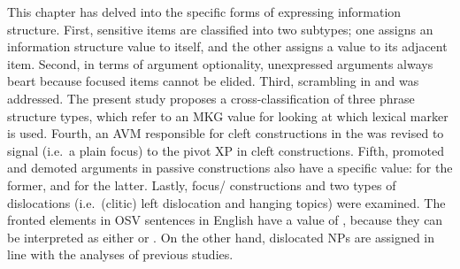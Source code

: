 This chapter has delved into the specific forms of expressing
information structure. First,  sensitive items are
classified into two subtypes; one assigns an
information structure value to itself, and the other assigns a value
to its adjacent item.  Second, in terms of argument
optionality, unexpressed arguments always
beart  because focused items cannot be elided. Third,
scrambling in  and  was addressed. The
present study proposes a cross-classification of three phrase
structure types, which refer to an MKG value for looking at which
lexical marker is used. Fourth, an AVM
responsible for cleft constructions in the  was revised to
signal  (i.e.\ a plain focus) to the pivot XP in cleft
constructions.  Fifth, promoted and demoted arguments in passive
constructions also have a specific 
value:  for the former, and
 for the latter.  Lastly, focus/
 constructions and two types of dislocations
(i.e.\ (clitic) left dislocation and hanging topics) were
examined. The fronted elements in OSV sentences in English have a
value of , because they can be interpreted as
either  or . On the
other hand, dislocated NPs are assigned  in line
with the analyses of previous studies.



